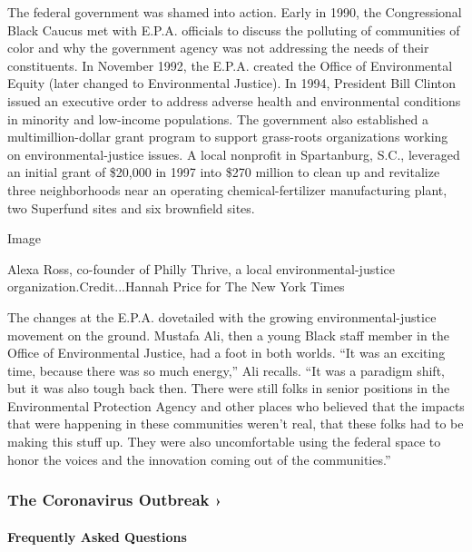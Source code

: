 The federal government was shamed into action. Early in 1990, the
Congressional Black Caucus met with E.P.A. officials to discuss the
polluting of communities of color and why the government agency was not
addressing the needs of their constituents. In November 1992, the E.P.A.
created the Office of Environmental Equity (later changed to
Environmental Justice). In 1994, President Bill Clinton issued an
executive order to address adverse health and environmental conditions
in minority and low-income populations. The government also established
a multimillion-dollar grant program to support grass-roots organizations
working on environmental-justice issues. A local nonprofit in
Spartanburg, S.C., leveraged an initial grant of \$20,000 in 1997 into
\$270 million to clean up and revitalize three neighborhoods near an
operating chemical-fertilizer manufacturing plant, two Superfund sites
and six brownfield sites.

Image

Alexa Ross, co-founder of Philly Thrive, a local environmental-justice
organization.Credit...Hannah Price for The New York Times

The changes at the E.P.A. dovetailed with the growing
environmental-justice movement on the ground. Mustafa Ali, then a young
Black staff member in the Office of Environmental Justice, had a foot in
both worlds. ``It was an exciting time, because there was so much
energy,'' Ali recalls. ``It was a paradigm shift, but it was also tough
back then. There were still folks in senior positions in the
Environmental Protection Agency and other places who believed that the
impacts that were happening in these communities weren't real, that
these folks had to be making this stuff up. They were also uncomfortable
using the federal space to honor the voices and the innovation coming
out of the communities.''

\href{https://www.nytimes3xbfgragh.onion/news-event/coronavirus?action=click\&pgtype=Article\&state=default\&region=MAIN_CONTENT_3\&context=storylines_faq}{}

\hypertarget{the-coronavirus-outbreak-}{%
\subsubsection{The Coronavirus Outbreak
›}\label{the-coronavirus-outbreak-}}

\hypertarget{frequently-asked-questions}{%
\paragraph{Frequently Asked
Questions}\label{frequently-asked-questions}}

